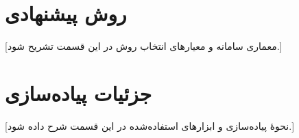 \section{روش پیشنهادی}
[معماری سامانه و معیارهای انتخاب روش در این قسمت تشریح شود.]

\section{جزئیات پیاده‌سازی}
[نحوۀ پیاده‌سازی و ابزارهای استفاده‌شده در این قسمت شرح داده شود.]
